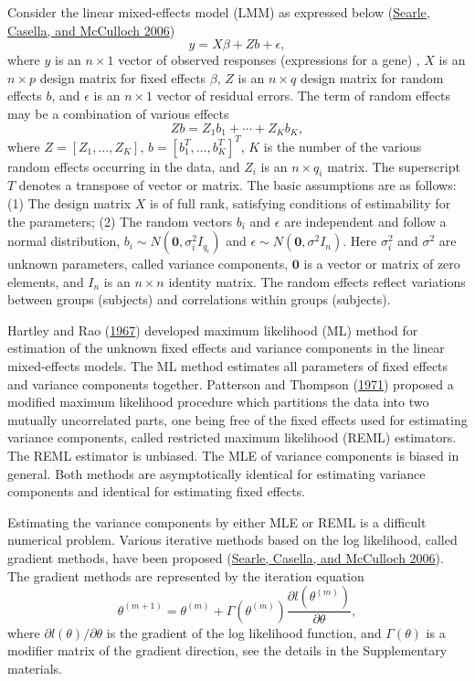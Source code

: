 \documentclass[
]{article}
\begin{document}
Consider the linear mixed-effects model (LMM) as expressed below
(\protect\hyperlink{ref-Searle2006}{Searle, Casella, and McCulloch
2006}) \begin{equation} \label{lmm}
y = X\beta + Zb + \epsilon,
\end{equation} where \(y\) is an \(n\times 1\) vector of observed
responses (expressions for a gene) , \(X\) is an \(n\times p\) design
matrix for fixed effects \(\beta\), \(Z\) is an \(n\times q\) design
matrix for random effects \(b\), and \(\epsilon\) is an \(n\times 1\)
vector of residual errors. The term of random effects may be a
combination of various effects \[
Zb = Z_1 b_1 + \cdots + Z_K b_K,
\] where \(Z=[Z_1,\ldots,Z_K]\), \(b=[b^T_1,\ldots,b^T_K]^T\), \(K\) is
the number of the various random effects occurring in the data, and
\(Z_i\) is an \(n\times q_i\) matrix. The superscript \(T\) denotes a
transpose of vector or matrix. The basic assumptions are as follows: (1)
The design matrix \(X\) is of full rank, satisfying conditions of
estimability for the parameters; (2) The random vectors \(b_i\) and
\(\epsilon\) are independent and follow a normal distribution,
\(b_i \sim N(\mathbf{0}, \sigma^2_i I_{q_i})\) and
\(\epsilon \sim N(\mathbf{0}, \sigma^2I_n)\). Here \(\sigma^2_i\) and
\(\sigma^2\) are unknown parameters, called variance components,
\(\mathbf{0}\) is a vector or matrix of zero elements, and \(I_n\) is an
\(n\times n\) identity matrix. The random effects reflect variations
between groups (subjects) and correlations within groups (subjects).

Hartley and Rao (\protect\hyperlink{ref-HartleyRao1967}{1967}) developed
maximum likelihood (ML) method for estimation of the unknown fixed
effects and variance components in the linear mixed-effects models. The
ML method estimates all parameters of fixed effects and variance
components together. Patterson and Thompson
(\protect\hyperlink{ref-PattersonThompson1971}{1971}) proposed a
modified maximum likelihood procedure which partitions the data into two
mutually uncorrelated parts, one being free of the fixed effects used
for estimating variance components, called restricted maximum likelihood
(REML) estimators. The REML estimator is unbiased. The MLE of variance
components is biased in general. Both methods are asymptotically
identical for estimating variance components and identical for
estimating fixed effects.

Estimating the variance components by either MLE or REML is a difficult
numerical problem. Various iterative methods based on the log
likelihood, called gradient methods, have been proposed
(\protect\hyperlink{ref-Searle2006}{Searle, Casella, and McCulloch
2006}). The gradient methods are represented by the iteration equation
\begin{equation}\label{gradient}
\theta^{(m+1)} = \theta^{(m)} + \Gamma(\theta^{(m)})\frac{\partial l(\theta^{(m)})}{\partial\theta},
\end{equation} where \(\partial l(\theta)/\partial\theta\) is the
gradient of the log likelihood function, and \(\Gamma(\theta)\) is a
modifier matrix of the gradient direction, see the details in the
Supplementary materials.
\end{document}
